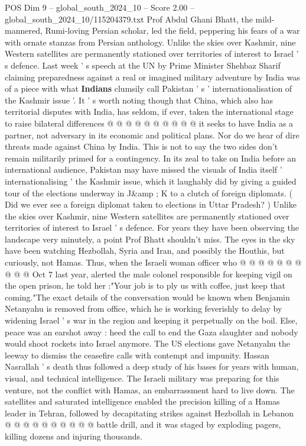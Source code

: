 \begin{textsample}{POS Dim 9 – global\_south\_2024\_10 – Score 2.00 – global\_south\_2024\_10/115204379.txt}
Prof Abdul Ghani Bhatt, the mild-mannered, Rumi-loving Persian scholar, led the field, peppering his fears of a war with ornate stanzas from Persian anthology.
Unlike the skies over Kashmir, nine Western satellites are permanently stationed over territories of interest to Israel ' s defence.
Last week ' s speech at the UN by Prime Minister Shehbaz Sharif claiming preparedness against a real or imagined military adventure by India was of a piece with what \textbf{Indians} clumsily call Pakistan ' s ' internationalisation of the Kashmir issue '.
It ' s worth noting though that China, which also has territorial disputes with India, has seldom, if ever, taken the international stage to raise bilateral differences @ @ @ @ @ @ @ @ @ @ it seeks to have India as a partner, not adversary in its economic and political plans.
Nor do we hear of dire threats made against China by India.
This is not to say the two sides don't remain militarily primed for a contingency.
In its zeal to take on India before an international audience, Pakistan may have missed the visuals of India itself ' internationalising ' the Kashmir issue, which it laughably did by giving a guided tour of the elections underway in J\&amp ; K to a clutch of foreign diplomats. ( Did we ever see a foreign diplomat taken to elections in Uttar Pradesh? ) Unlike the skies over Kashmir, nine Western satellites are permanently stationed over territories of interest to Israel ' s defence.
For years they have been observing the landscape very minutely, a point Prof Bhatt shouldn't miss.
The eyes in the sky have been watching Hezbollah, Syria and Iran, and possibly the Houthis, but curiously, not Hamas.
Thus, when the Israeli woman officer who @ @ @ @ @ @ @ @ @ @ Oct 7 last year, alerted the male colonel responsible for keeping vigil on the open prison, he told her :"Your job is to ply us with coffee, just keep that coming."The exact details of the conversation would be known when Benjamin Netanyahu is removed from office, which he is working feverishly to delay by widening Israel ' s war in the region and keeping it perpetually on the boil.
Else, peace was an earshot away : heed the call to end the Gaza slaughter and nobody would shoot rockets into Israel anymore.
The US elections gave Netanyahu the leeway to dismiss the ceasefire calls with contempt and impunity.
Hassan Nasrallah ' s death thus followed a deep study of his bases for years with human, visual, and technical intelligence.
The Israeli military was preparing for this venture, not the conflict with Hamas, an embarrassment hard to live down.
The satellites and saturated intelligence enabled the precision killing of a Hamas leader in Tehran, followed by decapitating strikes against Hezbollah in Lebanon @ @ @ @ @ @ @ @ @ @ battle drill, and it was staged by exploding pagers, killing dozens and injuring thousands.

\end{textsample}
